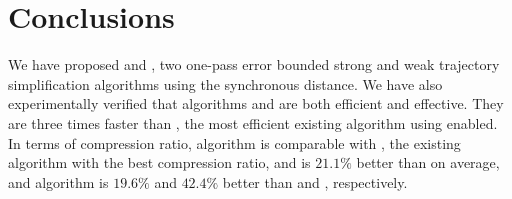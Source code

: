\section{Conclusions} %

We have proposed \cist and \cista, two one-pass error bounded strong and weak trajectory simplification algorithms using the  synchronous distance.
We have also experimentally verified that algorithms \cist and \cista are both efficient and effective.
They are three times faster than \squishe, the most efficient existing \lsa algorithm using \sed enabled.
In terms of compression ratio, algorithm \cist is {comparable} with \dpa, the existing \lsa algorithm with the best compression ratio, and is $21.1\%$ better than \squishe on average, and algorithm \cista is $19.6\%$ and $42.4\%$ better than \dps and \squishe, respectively.
